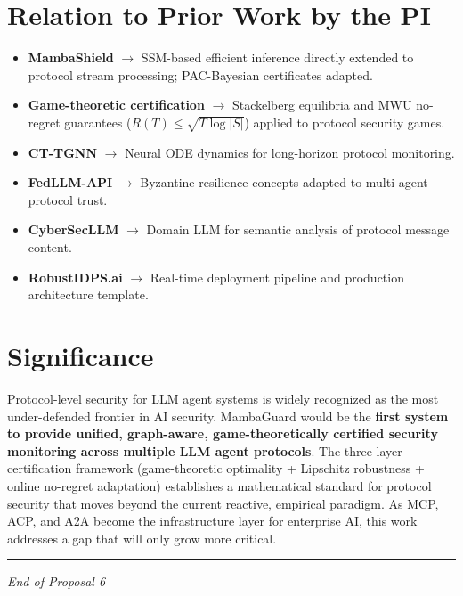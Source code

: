 \documentclass[12pt,a4paper]{article}
\begin{document}
\section{Relation to Prior Work by the PI}

\begin{itemize}
    \item \textbf{MambaShield} $\to$ SSM-based efficient inference directly extended to protocol stream processing; PAC-Bayesian certificates adapted.
    \item \textbf{Game-theoretic certification} $\to$ Stackelberg equilibria and MWU no-regret guarantees ($R(T) \leq \sqrt{T \log |S|}$) applied to protocol security games.
    \item \textbf{CT-TGNN} $\to$ Neural ODE dynamics for long-horizon protocol monitoring.
    \item \textbf{FedLLM-API} $\to$ Byzantine resilience concepts adapted to multi-agent protocol trust.
    \item \textbf{CyberSecLLM} $\to$ Domain LLM for semantic analysis of protocol message content.
    \item \textbf{RobustIDPS.ai} $\to$ Real-time deployment pipeline and production architecture template.
\end{itemize}

\section{Significance}

Protocol-level security for LLM agent systems is widely recognized as the most under-defended frontier in AI security. MambaGuard would be the \textbf{first system to provide unified, graph-aware, game-theoretically certified security monitoring across multiple LLM agent protocols}. The three-layer certification framework (game-theoretic optimality + Lipschitz robustness + online no-regret adaptation) establishes a mathematical standard for protocol security that moves beyond the current reactive, empirical paradigm. As MCP, ACP, and A2A become the infrastructure layer for enterprise AI, this work addresses a gap that will only grow more critical.

\vspace{1cm}
\hrule
\vspace{0.3cm}
\begin{center}
\textit{End of Proposal 6}
\end{center}
\end{document}
